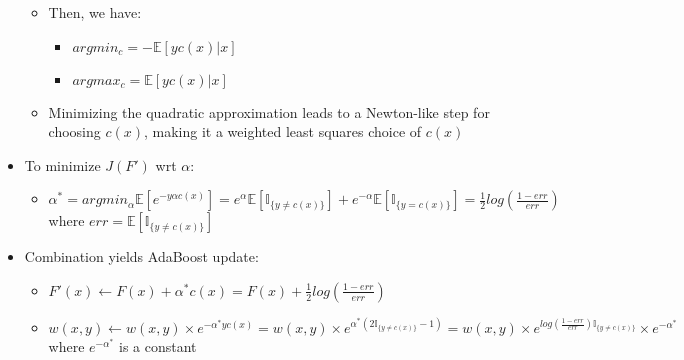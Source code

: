 \begin{itemize}
\begin{itemize}
        \item Then, we have:
        \begin{itemize}
            \item $argmin_c = -\mathbb{E} [ y c(x) | x ]$
            \item $argmax_c = \mathbb{E} [ y c(x) | x ]$
        \end{itemize}
        \item Minimizing the quadratic approximation leads to a Newton-like step for choosing $c(x)$, making it a weighted least squares choice of $c(x)$
    \end{itemize}
    \item To minimize $J(F')$ wrt $\alpha$:
    \begin{itemize}
        \item $\alpha^{*} = argmin_\alpha \mathbb{E} [ e^{-y \alpha c(x)} ] = e^\alpha \mathbb{E} [ \mathbb{I}_{\{ y \neq c(x) \}} ] + e^{-\alpha} \mathbb{E} [ \mathbb{I}_{\{ y = c(x) \}} ] = \frac{1}{2} log(\frac{1-err}{err})$ where $err = \mathbb{E} [ \mathbb{I}_{\{ y \neq c(x) \}} ]$
    \end{itemize}
    \item Combination yields AdaBoost update:
    \begin{itemize}
        \item $F'(x) \leftarrow F(x) + \alpha^{*} c(x) = F(x) + \frac{1}{2} log( \frac{1-err}{err} )$
        \item $w(x,y) \leftarrow w(x,y) \times e^{-\alpha^{*} y c(x)} = w(x,y) \times e^{\alpha^{*} (2 \mathbb{I}_{\{ y \neq c(x) \}} - 1)} = w(x,y) \times e^{log(\frac{1-err}{err}) \mathbb{I}_{\{ y \neq c(x) \}}} \times e^{-\alpha^{*}}$ where $e^{-\alpha^{*}}$ is a constant
    \end{itemize}
\end{itemize}